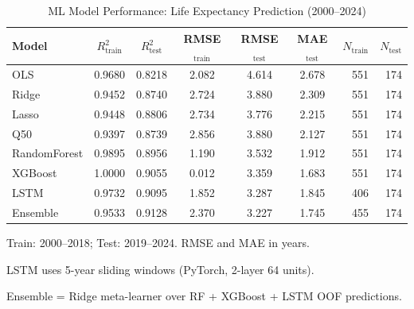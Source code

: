 \begin{table}[htbp]
  \centering
  \caption{ML Model Performance: Life Expectancy Prediction (2000--2024)}
  \label{tab:model_performance}
  \begin{tabular}{lcccccrr}
    \toprule
    Model & $R^2_{\text{train}}$ & $R^2_{\text{test}}$ &
    RMSE$_{\text{train}}$ & RMSE$_{\text{test}}$ &
    MAE$_{\text{test}}$ & $N_{\text{train}}$ & $N_{\text{test}}$ \\
    \midrule
    OLS              & 0.9680 & 0.8218 & 2.082 & 4.614 & 2.678 & 551 & 174 \\
    Ridge            & 0.9452 & 0.8740 & 2.724 & 3.880 & 2.309 & 551 & 174 \\
    Lasso            & 0.9448 & 0.8806 & 2.734 & 3.776 & 2.215 & 551 & 174 \\
    Q50              & 0.9397 & 0.8739 & 2.856 & 3.880 & 2.127 & 551 & 174 \\
    RandomForest     & 0.9895 & 0.8956 & 1.190 & 3.532 & 1.912 & 551 & 174 \\
    XGBoost          & 1.0000 & 0.9055 & 0.012 & 3.359 & 1.683 & 551 & 174 \\
    LSTM             & 0.9732 & 0.9095 & 1.852 & 3.287 & 1.845 & 406 & 174 \\
    Ensemble         & 0.9533 & 0.9128 & 2.370 & 3.227 & 1.745 & 455 & 174 \\
    \bottomrule
  \end{tabular}
  \begin{tablenotes}
    \small
    \item Train: 2000--2018; Test: 2019--2024. RMSE and MAE in years.
    \item LSTM uses 5-year sliding windows (PyTorch, 2-layer 64 units).
    \item Ensemble = Ridge meta-learner over RF + XGBoost + LSTM OOF predictions.
  \end{tablenotes}
\end{table}
